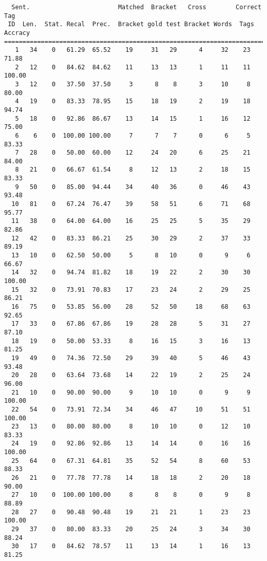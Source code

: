 \scriptsize
\begin{verbatim}
  Sent.                        Matched  Bracket   Cross        Correct Tag
 ID  Len.  Stat. Recal  Prec.  Bracket gold test Bracket Words  Tags Accracy
============================================================================
   1   34    0   61.29  65.52    19     31   29      4     32    23    71.88
   2   12    0   84.62  84.62    11     13   13      1     11    11   100.00
   3   12    0   37.50  37.50     3      8    8      3     10     8    80.00
   4   19    0   83.33  78.95    15     18   19      2     19    18    94.74
   5   18    0   92.86  86.67    13     14   15      1     16    12    75.00
   6    6    0  100.00 100.00     7      7    7      0      6     5    83.33
   7   28    0   50.00  60.00    12     24   20      6     25    21    84.00
   8   21    0   66.67  61.54     8     12   13      2     18    15    83.33
   9   50    0   85.00  94.44    34     40   36      0     46    43    93.48
  10   81    0   67.24  76.47    39     58   51      6     71    68    95.77
  11   38    0   64.00  64.00    16     25   25      5     35    29    82.86
  12   42    0   83.33  86.21    25     30   29      2     37    33    89.19
  13   10    0   62.50  50.00     5      8   10      0      9     6    66.67
  14   32    0   94.74  81.82    18     19   22      2     30    30   100.00
  15   32    0   73.91  70.83    17     23   24      2     29    25    86.21
  16   75    0   53.85  56.00    28     52   50     18     68    63    92.65
  17   33    0   67.86  67.86    19     28   28      5     31    27    87.10
  18   19    0   50.00  53.33     8     16   15      3     16    13    81.25
  19   49    0   74.36  72.50    29     39   40      5     46    43    93.48
  20   28    0   63.64  73.68    14     22   19      2     25    24    96.00
  21   10    0   90.00  90.00     9     10   10      0      9     9   100.00
  22   54    0   73.91  72.34    34     46   47     10     51    51   100.00
  23   13    0   80.00  80.00     8     10   10      0     12    10    83.33
  24   19    0   92.86  92.86    13     14   14      0     16    16   100.00
  25   64    0   67.31  64.81    35     52   54      8     60    53    88.33
  26   21    0   77.78  77.78    14     18   18      2     20    18    90.00
  27   10    0  100.00 100.00     8      8    8      0      9     8    88.89
  28   27    0   90.48  90.48    19     21   21      1     23    23   100.00
  29   37    0   80.00  83.33    20     25   24      3     34    30    88.24
  30   17    0   84.62  78.57    11     13   14      1     16    13    81.25

\end{verbatim}
